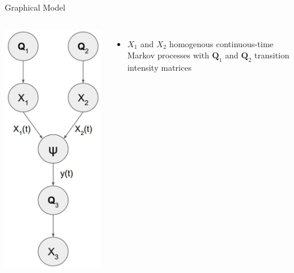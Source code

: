 \documentclass[
	english,%
	aspectratio=169,%
	color={accentcolor=3b},
	logo=true,%
	colorframetitle=false,%
	]{tudabeamer}
\begin{document}
\begin{frame}{Graphical Model}
\fontsize{9pt}{6}\selectfont
\begin{columns}[onlytextwidth,c]
	\centering
	\includegraphics[width=0.75\linewidth]{figures/h_model}
	\begin{itemize}
		\item $ X_{1} $ and $ X_{2} $ homogenous continuous-time Markov processes with $ \textbf{Q}_{1} $ and $ \textbf{Q}_{2} $ transition intensity matrices

\end{itemize}
\end{columns}
\end{frame}
\end{document}
